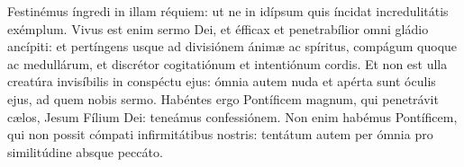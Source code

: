 Festinémus íngredi in illam réquiem:
	ut ne in idípsum quis íncidat incredulitátis exémplum.
Vivus est enim sermo Dei, et éfficax et penetrabílior omni gládio ancípiti:
	et pertíngens usque ad divisiónem ánimæ ac spíritus,
	compágum quoque ac medullárum, et discrétor cogitatiónum et intentiónum cordis.
Et non est ulla creatúra invisíbilis in conspéctu ejus:
	ómnia autem nuda et apérta sunt óculis ejus, ad quem nobis sermo.
Habéntes ergo Pontíficem magnum, qui penetrávit cælos, Jesum Fílium Dei:
	teneámus confessiónem.
Non enim habémus Pontíficem, qui non possit cómpati infirmitátibus nostris:
	tentátum autem per ómnia pro similitúdine absque peccáto.
